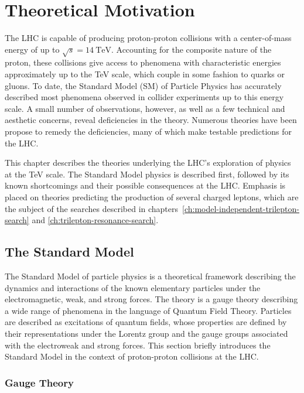 \chapter{Theoretical Motivation}\label{ch:theory}

The LHC is capable of producing proton-proton collisions with a center-of-mass energy of up to $\sqrt{s}=14~\mbox{TeV}$. Accounting for the composite nature of the proton, these collisions give access to phenomena with characteristic energies approximately up to the TeV scale, which couple in some fashion to quarks or gluons. To date, the Standard Model (SM) of Particle Physics has accurately described most phenomena observed in collider experiments up to this energy scale. A small number of observations, however, as well as a few technical and aesthetic concerns, reveal deficiencies in the theory. Numerous theories have been propose to remedy the deficiencies, many of which make testable predictions for the LHC.

This chapter describes the theories underlying the LHC's exploration of physics at the TeV scale. The Standard Model physics is described first, followed by its known shortcomings and their possible consequences at the LHC. Emphasis is placed on theories predicting the production of several charged leptons, which are the subject of the searches described in chapters~\ref{ch:model-independent-trilepton-search} and \ref{ch:trilepton-resonance-search}.


\section{The Standard Model}\label{sec:standard-model}
The Standard Model of particle physics is a theoretical framework describing the dynamics and interactions of the known elementary particles under the electromagnetic, weak, and strong forces. The theory is a gauge theory describing a wide range of phenomena in the language of Quantum Field Theory. Particles are described as excitations of quantum fields, whose properties are defined by their representations under the Lorentz group and the gauge groups associated with the electroweak and strong forces. This section briefly introduces the Standard Model in the context of proton-proton collisions at the LHC.


\subsection{Gauge Theory}

